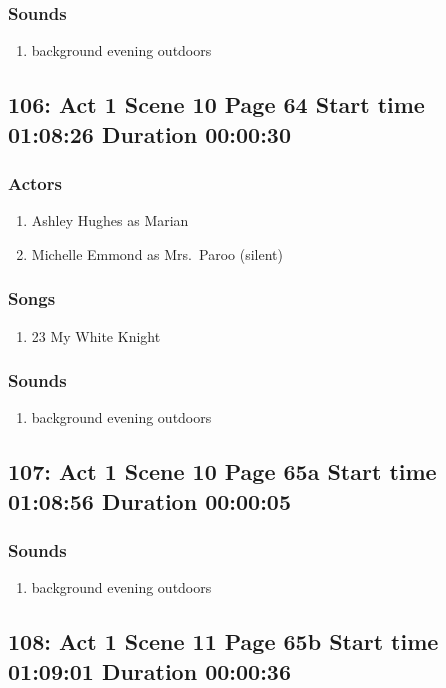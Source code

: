 \subsubsection{Sounds}
\begin{enumerate}
\item background evening outdoors
\end{enumerate}
\subsection{106: Act 1 Scene 10 Page 64 Start time 01:08:26 Duration 00:00:30}

\subsubsection{Actors}
\begin{enumerate}
\item Ashley Hughes as Marian
\item Michelle Emmond as Mrs.~Paroo (silent)
\end{enumerate}

\subsubsection{Songs}
\begin{enumerate}
\item 23 My White Knight
\end{enumerate}\subsubsection{Sounds}
\begin{enumerate}
\item background evening outdoors
\end{enumerate}
\subsection{107: Act 1 Scene 10 Page 65a Start time 01:08:56 Duration 00:00:05}
\subsubsection{Sounds}
\begin{enumerate}
\item background evening outdoors
\end{enumerate}
\subsection{108: Act 1 Scene 11 Page 65b Start time 01:09:01 Duration 00:00:36}

